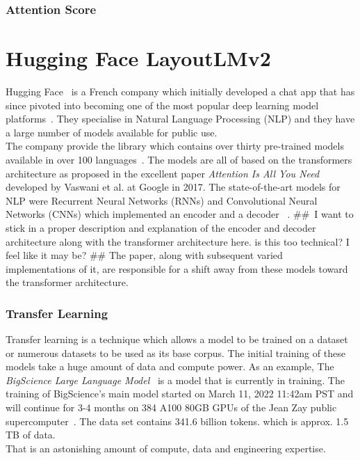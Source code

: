 \subsubsection{Attention Score}



\section{Hugging Face LayoutLMv2}
Hugging Face~\autocite{HuggingFaceAI} is a French company which initially developed a chat app that has since pivoted into becoming one of the most
popular deep learning model platforms~\autocite{syalHuggingFaceStep2020}. They specialise in Natural Language Processing (NLP) and they have a large
number of models available for public use.\\ The company provide the  library which contains over thirty pre-trained models available
in over 100 languages~\autocite{HuggingFaceTransformers}. The models are all of based on the transformers architecture as proposed in the excellent paper
\emph{Attention Is All You Need}~\autocite{vaswaniAttentionAllYou} developed by Vaswani et al. at Google in 2017. The state-of-the-art models for NLP
were Recurrent Neural Networks (RNNs) and Convolutional Neural Networks (CNNs) which implemented an encoder and a decoder
~\autocite{brownleeEncoderDecoderRecurrentNeural2017}. \#\#\ I want to stick in a proper description and explanation of the encoder and decoder
architecture along with the transformer architecture here. is this too technical? I feel like it may be? \#\#
The paper, along with subsequent varied implementations of it, are responsible for a shift away from these models toward the transformer architecture.
\bigbreak
\subsubsection{Transfer Learning}
Transfer learning is a technique which allows a model to be trained on a dataset or numerous datasets to be used as its base corpus. The initial
training of these models take a huge amount of data and compute power.
\bigbreak
As an example, The \emph{BigScience Large Language Model}~\autocite{BigScienceResearchWorkshop}
is a model that is currently in training. The training of BigScience's main model started on March 11, 2022 11:42am PST and will continue
for 3-4 months on 384 A100 80GB GPUs of the Jean Zay public supercomputer~\autocite{BigscienceTr11176BmllogsHugging}. The data set
contains 341.6 billion tokens. which is approx. 1.5 TB of data.\\ That is an astonishing amount of compute, data and engineering expertise.

